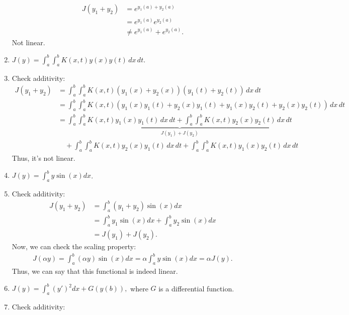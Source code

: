 \documentclass{article}
\begin{document}
\begin{enumerate}[label={(\alph*)}]
\begin{equation*}
    \begin{split}
      J(y_1 + y_2) &= e^{y_1(a) + y_2(a)}\\
      &= e^{y_1(a)}e^{y_2(a)}\\
      & \neq e^{y_1(a)} + e^{y_2(a)}.
    \end{split}
  \end{equation*}
Not linear.
\item $ J(y) = \int_a^b \int_a^b K(x,t) y(x) y(t)\, dx\, dt$.
\item[]Check additivity:
  \begin{equation*}
    \begin{split}
      J(y_1 + y_2) & = \int_a^b \int_a^b K(x,t) (y_1(x) + y_2(x))( y_1(t)
      + y_2(t))\, dx\, dt\\
      & = \int_a^b \int_a^b K(x,t) \left(y_1(x)y_1(t)  + y_2(x)y_1(t)
        + y_1(x)y_2(t) + y_2(x)y_2(t)\right)\, dx\, dt\\
      &=  \underbrace{\int_a^b \int_a^b K(x,t)y_1(x)y_1(t)\, dx\, dt  +
        \int_a^b \int_a^b K(x,t)y_2(x)y_2(t)\, dx\, dt}_{J(y_1) + J(y_2)}\\
      &\quad+ \int_a^b \int_a^b K(x,t)y_2(x)y_1(t)\, dx\, dt
        + \int_a^b \int_a^b K(x,t)y_1(x)y_2(t)\, dx\, dt
    \end{split}
  \end{equation*}
Thus, it's not linear.
\item $ J(y) = \int_a^b y \sin(x) dx$.
\item[]Check additivity:
  \begin{equation*}
    \begin{split}
      J(y_1 + y_2) & = \int_a^b (y_1 + y_2)  \sin(x) dx\\
      & = \int_a^b y_1 \sin(x) dx + \int_a^b y_2 \sin(x) dx\\
      & = J(y_1) + J(y_2).
    \end{split}
  \end{equation*}
Now, we can check the scaling property:
\begin{equation*}
  \begin{split}
    J(\alpha y) = \int_a^b (\alpha y) \sin(x) dx = \alpha \int_a^b y
    \sin(x) dx = \alpha J(y).
  \end{split}
\end{equation*}
Thus, we can say that this functional is indeed linear.
\item $ J(y) = \int_a^b (y')^2 dx + G(y(b)),$ where $G$ is a
  differential function.
\item[]Check additivity:

\end{enumerate}
\end{document}
